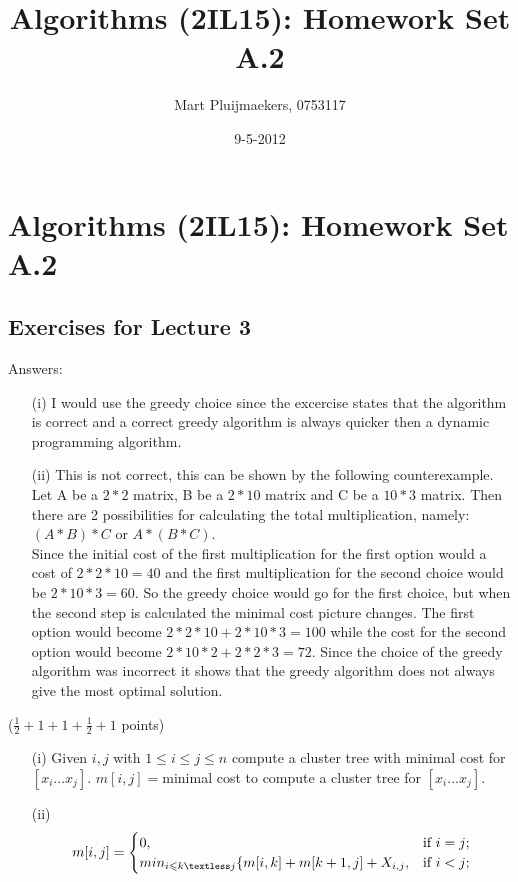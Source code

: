 \documentclass{article}
\title{Algorithms (2IL15): Homework Set A.2}
\author{Mart Pluijmaekers, 0753117}
\date{9-5-2012}
\renewcommand{\leq}{\leqslant}
\newcounter{rcounter}
\newenvironment{rlist}%
{\begin{list}{A.2-\arabic{rcounter}}{\usecounter{rcounter}}}{\end{list}}
\begin{document}
\section*{Algorithms (2IL15): Homework Set A.2}

\subsection*{Exercises for Lecture 3}
\begin{rlist}
\item Answers:
\begin{enumerate}
      \item[(i)] I would use the greedy choice since the excercise states that the algorithm is correct and a correct greedy algorithm is always quicker then a dynamic programming algorithm.
      \item[(ii)] This is not correct, this can be shown by the following counterexample.\\ Let A be a $2*2$ matrix, B be a $2*10$ matrix and C be a $10*3$ matrix. Then there are 2 possibilities for calculating the total multiplication, namely: $(A*B)*C$ or $A*(B*C)$. \\ Since the initial cost of the first multiplication for the first option would a cost of $2*2*10=40$ and the first multiplication for the second choice would be $2*10*3=60$. So the greedy choice would go for the first choice, but when the second step is calculated the minimal cost picture changes. The first option would become $2*2*10+2*10*3=100$ while the cost for the second option would become $2*10*2+2*2*3=72$. Since the choice of the greedy algorithm was incorrect it shows that the greedy algorithm does not always give the most optimal solution.
      \end{enumerate}

\item ($\frac{1}{2}+1+1+\frac{1}{2}+1$ points)
      
      \begin{enumerate}
      \item[(i)] Given $i,j$ with $1\leq i \le j \leq n$ compute a cluster tree with minimal cost for $[x_i ... x_j]$.
$m[i,j]=$minimal cost to compute a cluster tree for $[x_i ... x_j]$.
      \item[(ii)] \[
m[i,j]=
\begin{cases}
0, &\text{if $i=j$;}\\
min_{i\leq k\textless j} \{m[i,k]+m[k+1,j] +X_{i,j}, &\text{if $i<j$;} 
\end{cases}
\]


\end{enumerate}
\end{rlist}
\end{document}
